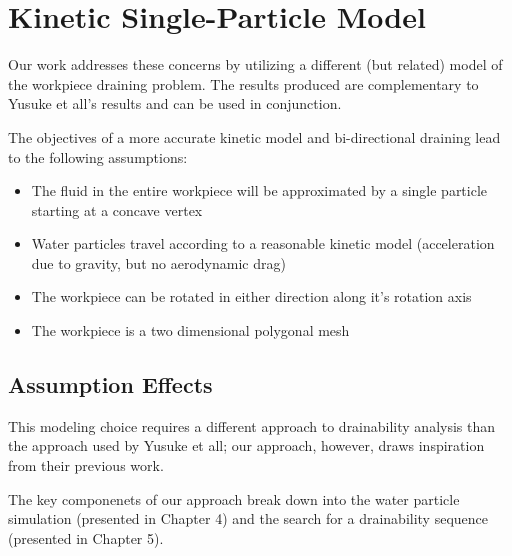 


\section{Kinetic Single-Particle Model}

Our work addresses these concerns by utilizing a different (but related) model of the workpiece draining problem. The results produced are complementary to Yusuke et all's results and can be used in conjunction.

The objectives of a more accurate kinetic model and bi-directional draining lead to the following assumptions:

\begin{itemize}
	\item The fluid in the entire workpiece will be approximated by a single particle starting at a concave vertex
	\item Water particles travel according to a reasonable kinetic model (acceleration due to gravity, but no aerodynamic drag)
	\item The workpiece can be rotated in either direction along it's rotation axis
	\item The workpiece is a two dimensional polygonal mesh
\end{itemize}

	\subsection{Assumption Effects}

This modeling choice requires a different approach to drainability analysis than the approach used by Yusuke et all; our approach, however, draws inspiration from their previous work.

The key componenets of our approach break down into the water particle simulation (presented in Chapter 4) and the search for a drainability sequence (presented in Chapter 5).



